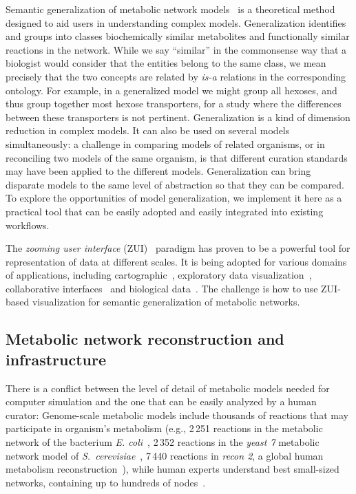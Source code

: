 \documentclass{bmcart}
\begin{document}
Semantic generalization of metabolic network models~\cite{Zhukova2014} is a theoretical
method designed to aid users in understanding complex models. Generalization identifies
and groups into classes biochemically similar metabolites and functionally similar reactions in the
network. While we say ``similar'' in the commonsense way that a biologist would consider
that the entities belong to the same class, we mean precisely that the two concepts are
related by \emph{is-a} relations in the corresponding ontology.
For example, in a generalized model we might group all hexoses, and thus group together
most hexose transporters, for a study where the differences between these transporters is
not pertinent.
Generalization is a kind of dimension reduction in complex models.
It can also be used on several models simultaneously:
a challenge in comparing models of related organisms, or in reconciling two models of the
same organism, is that different curation standards may have been applied to the different models.
Generalization can bring disparate models to the same level of abstraction so that they
can be compared.
To explore the opportunities of model generalization, we implement it here as a practical
tool that can be easily adopted and easily integrated into existing workflows.

The \emph{zooming user interface} (ZUI)~\cite{Bederson1998} paradigm has proven to be a powerful tool for representation of data at different scales. It is being adopted for various domains of applications, including cartographic~\cite{Nivala2008}, exploratory data visualization~\cite{Roberts2005}, collaborative interfaces~\cite{Laufer2011} and biological data~\cite{Pook1998, Hu2007}. The challenge is how to use ZUI-based visualization for semantic generalization of metabolic networks.

\subsection*{Metabolic network reconstruction and infrastructure}
There is a conflict between the level of detail of metabolic models needed for computer simulation and the one that can be easily analyzed by a human curator: Genome-scale metabolic models include thousands of reactions that may participate in organism's metabolism (e.g.,  2\,251 reactions in the metabolic network of the bacterium \emph{E. coli}~\cite{Orth2011}, 2\,352 reactions in the \emph{yeast 7} metabolic network model of \emph{S.~cerevisiae}~\cite{Aung2013}, 7\,440 reactions in \emph{recon 2},  a global human metabolism reconstruction~\cite{Thiele2013}), while human experts understand best small-sized networks, containing up to hundreds of nodes~\cite{VonLandesberger2011,Herman2000}.
\end{document}

